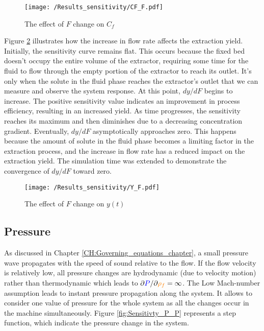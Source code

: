 \documentclass[../Article_Model_Parameters.tex]{subfiles}
\begin{document}
    \begin{figure}[h!]
    	\centering
    	\texttt{[image: /Results\_sensitivity/CF\_F.pdf]}
    	\caption{The effect of $F$ change on $C_f$}
    	\label{fig:Sensitivty_F_CF}
    \end{figure}

    Figure \ref{fig:Sensitivty_F_y} illustrates how the increase in flow rate affects the extraction yield. Initially, the sensitivity curve remains flat. This occurs because the fixed bed doesn't occupy the entire volume of the extractor, requiring some time for the fluid to flow through the empty portion of the extractor to reach its outlet. It's only when the solute in the fluid phase reaches the extractor's outlet that we can measure and observe the system response. At this point, $dy/dF$ begins to increase. The positive sensitivity value indicates an improvement in process efficiency, resulting in an increased yield. As time progresses, the sensitivity reaches its maximum and then diminishes due to a decreasing concentration gradient. Eventually, $dy/dF$ asymptotically approaches zero. This happens because the amount of solute in the fluid phase becomes a limiting factor in the extraction process, and the increase in flow rate has a reduced impact on the extraction yield. The simulation time was extended to demonstrate the convergence of $dy/dF$ toward zero.
    
    \begin{figure}[h!]
    	\centering
    	\texttt{[image: /Results\_sensitivity/Y\_F.pdf]}
    	\caption{The effect of $F$ change on $y(t)$}
    	\label{fig:Sensitivty_F_y}
    \end{figure}
    
    \subsection{Pressure}
    
    As discussed in Chapter \ref{CH:Governing_equations_chapter}, a small pressure wave propagates with the speed of sound relative to the flow. If the flow velocity is relatively low, all pressure changes are hydrodynamic (due to velocity motion) rather than thermodynamic which leads to $\partial {\color{blue}P}/\partial {\color{orange}\rho_f} = \infty$. The Low Mach-number assumption leads to instant pressure propagation along the system. It allows to consider one value of pressure for the whole system as all the changes occur in the machine simultaneously. Figure \ref{fig:Sensitivty_P_P} represents a step function, which indicate the pressure change in the system. 
    
\end{document}
